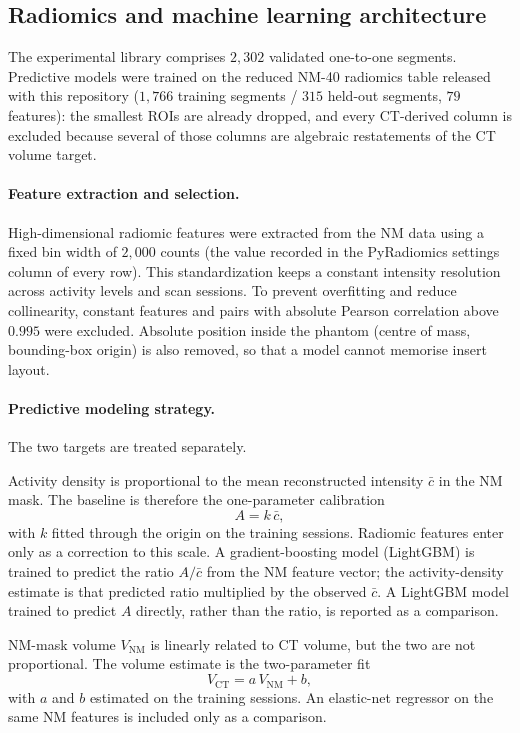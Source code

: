 \subsection{Radiomics and machine learning architecture}

The experimental library comprises $2{,}302$ validated one-to-one segments.
Predictive models were trained on the reduced NM-40 radiomics table released with this repository ($1{,}766$ training segments / $315$ held-out segments, $79$ features): the smallest ROIs are already dropped, and every CT-derived column is excluded because several of those columns are algebraic restatements of the CT volume target.

\paragraph{Feature extraction and selection.}
High-dimensional radiomic features were extracted from the NM data using a fixed bin width of $2{,}000$ counts (the value recorded in the PyRadiomics settings column of every row).
This standardization keeps a constant intensity resolution across activity levels and scan sessions.
To prevent overfitting and reduce collinearity, constant features and pairs with absolute Pearson correlation above $0.995$ were excluded.
Absolute position inside the phantom (centre of mass, bounding-box origin) is also removed, so that a model cannot memorise insert layout.

\paragraph{Predictive modeling strategy.}
The two targets are treated separately.

Activity density is proportional to the mean reconstructed intensity $\bar{c}$ in the NM mask.
The baseline is therefore the one-parameter calibration
\begin{equation}
\label{eq:activity-cal}
A = k\,\bar{c},
\end{equation}
with $k$ fitted through the origin on the training sessions.
Radiomic features enter only as a correction to this scale.
A gradient-boosting model (LightGBM) is trained to predict the ratio $A/\bar{c}$ from the NM feature vector; the activity-density estimate is that predicted ratio multiplied by the observed $\bar{c}$.
A LightGBM model trained to predict $A$ directly, rather than the ratio, is reported as a comparison.

NM-mask volume $V_{\mathrm{NM}}$ is linearly related to CT volume, but the two are not proportional.
The volume estimate is the two-parameter fit
\begin{equation}
\label{eq:volume-cal}
V_{\mathrm{CT}} = a\,V_{\mathrm{NM}} + b,
\end{equation}
with $a$ and $b$ estimated on the training sessions.
An elastic-net regressor on the same NM features is included only as a comparison.


